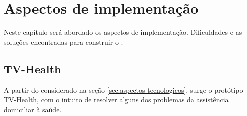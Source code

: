 \chapter{Aspectos de implementação}\label{cap:aspectos-de-implementacao}

Neste capítulo será abordado os aspectos de implementação. Dificuldades e as
soluções encontradas para construir o \software.

\section{TV-Health} \label{sec:tv-health} 

A partir do considerado na seção \ref{sec:aspectos-tecnologicos}, surge o
protótipo TV-Health, com o intuito de resolver alguns dos problemas da
assistência domiciliar à saúde.





